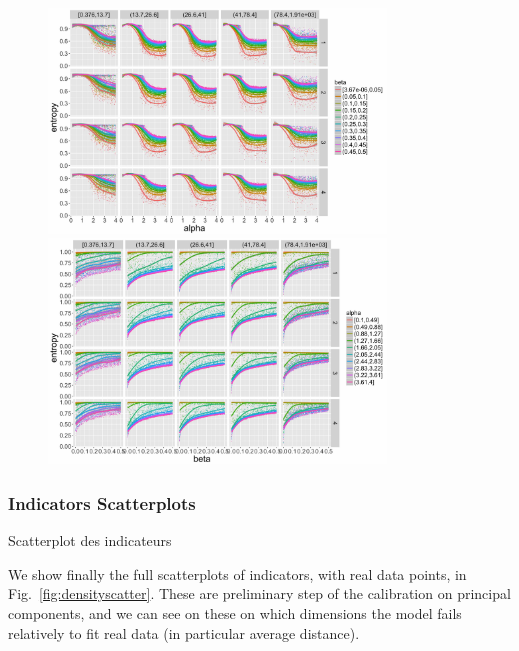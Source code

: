 \begin{figure}
\centering
\includegraphics[width=0.8\textwidth]{Figures/Density/entropy_alpha}
\includegraphics[width=0.8\textwidth]{Figures/Density/entropy_beta}
\label{}
\end{figure}






\subsubsection{Indicators Scatterplots}{Scatterplot des indicateurs}


We show finally the full scatterplots of indicators, with real data points, in Fig.~\ref{fig:densityscatter}. These are preliminary step of the calibration on principal components, and we can see on these on which dimensions the model fails relatively to fit real data (in particular average distance).


